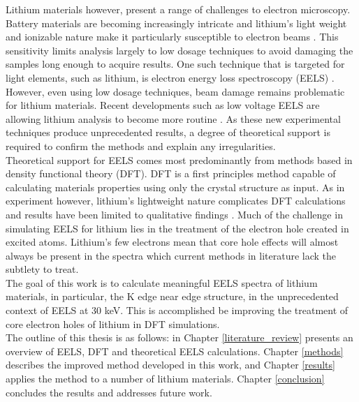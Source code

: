 Lithium materials however, present a range of challenges to electron microscopy.  Battery materials are becoming increasingly intricate and lithium's light weight and ionizable nature make it particularly susceptible to electron beams \cite{kobayashi_quantitative_2017}.  This sensitivity limits analysis largely to low dosage techniques to avoid damaging the samples long enough to acquire results.  One such technique that is targeted for light elements, such as lithium, is electron energy loss spectroscopy (EELS) \cite{Egerton}.  However, even using low dosage techniques,  beam damage remains problematic for lithium materials.  Recent developments such as low voltage EELS are allowing lithium analysis to become more routine \cite{SU_9000}. As these new experimental techniques produce unprecedented results, a degree of theoretical support is required to confirm the methods and explain any irregularities.  
\\

Theoretical support for EELS  comes most predominantly from methods based in density functional theory (DFT). DFT is a first principles method capable of calculating materials properties using only the crystal structure as input.  As in experiment however, lithium's lightweight nature complicates DFT calculations and results have been limited to qualitative findings \cite{mauchamp_ab_2006, mauchamp_local_2008}. Much of the challenge in simulating EELS for lithium lies in the treatment of the electron hole created in excited atoms.  Lithium's few electrons mean that core hole effects will almost always be present in the spectra which current methods in literature lack the subtlety to treat. \\

The goal of this work is to calculate meaningful EELS spectra of lithium materials, in particular, the K edge near edge structure, in the unprecedented context of EELS at 30 keV. This is accomplished be improving the treatment of core electron holes of lithium in DFT simulations. \\

The outline of this thesis is as follows: in Chapter \ref{literature_review} presents an overview of EELS, DFT and theoretical EELS calculations.  Chapter \ref{methods} describes the improved method developed in this work, and Chapter \ref{results} applies the method to a number of lithium materials.  Chapter \ref{conclusion} concludes the results and addresses future work.


